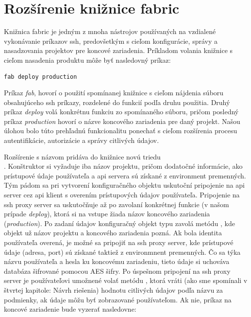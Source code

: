 \section{Rozšírenie knižnice fabric}\label{sec:rozsierenie-kniznice-fabric}

Knižnica fabric je jedným z mnoha nástrojov používaných na vzdialené vykonávanie príkazov ssh, predovšetkým s cieľom konfigurácie, správy a
nasadzovania projektov pre koncové zariadenia.
Príkladom volania knižnice s cieľom nasadenia produktu môže byť nasledovný príkaz:

\begin{Verbatim}[frame=single]
fab deploy production
\end{Verbatim}

Príkaz \emph{fab}, hovorí o použití spomínanej knižnice s cieľom nájdenia súboru obsahujúceho ssh príkazy, rozdelené do funkcií podľa druhu použitia.
Druhý príkaz \emph{deploy} volá konkrétnu funkciu zo spomínaného súboru, pričom posledný príkaz \emph{production} hovorí o názve koncového zariadenia pre daný projekt.
Našou úlohou bolo túto prehľadnú funkcionalitu ponechať s cieľom rozšírenia procesu autentifikácie, autorizácie a správy citlivých údajov.

Rozšírenie s názvom  pridáva do knižnice novú triedu \\ .
Konštruktor si vyžaduje iba názov projektu, pričom dodatočné informácie, ako prístupové údaje používateľa a api servera sú
získané z environment premenných.
Tým pádom sa pri vytvorení konfiguračného objektu uskutoční pripojenie na api server cez api klient s overením prístupových
údajov používateľa.
Pripojenie na ssh proxy server sa uskutočňuje až po zavolaní konkrétnej funkcie (v našom prípade \emph{deploy}), ktorá si
na vstupe žiada názov koncového zariadenia (\emph{production}).
Po zadaní údajov konfiguračný objekt typu  zavolá metódu , kde objekt už názov
projektu a koncového zariadenia pozná.
Ak bola identita používateľa overená, je možné sa pripojiť na ssh proxy server, kde prístupové údaje
(adresa, port) sú získané taktiež z environmnent premenných.
Čo sa týka názvu používateľa a hesla ku koncovému zariadeniu, tieto údaje si uchováva databáza šifrované pomocou AES šifry.
Po úspešnom pripojení na ssh proxy server je používateľovi umožnené volať metódu , ktorá vráti
(ako sme spomínali v štvrtej kapitole: Návrh riešenia) hodnotu citlivých údajov podľa názvu za podmienky, ak údaje môžu
byť zobrazované používateľom. Ak nie, príkaz na koncové zariadenie bude vyzerať nasledovne:


